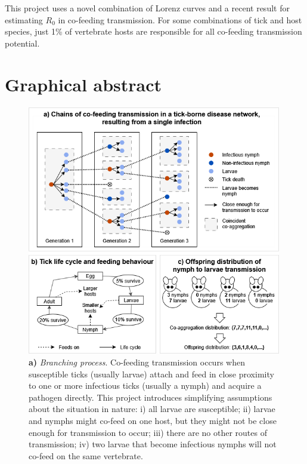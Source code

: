 \documentclass{article}
\begin{document}
This project uses a novel combination of Lorenz curves and a recent result for estimating $ R_0 $ in co-feeding transmission. For some combinations of tick and host species, just 1\% of vertebrate hosts are responsible for all co-feeding transmission potential.

\thispagestyle{empty}
\addtocounter{page}{-1}

\newpage

\section*{Graphical abstract}

\begin{figure}[h!]
	\begin{mdframed}[backgroundcolor=grey250,rightline=false,leftline=false,topline=false]
	    \includegraphics[width=0.99\textwidth, center]{graphical_abstract_mk2.drawio}
	    \caption{
	    \textbf{a)} \textit{Branching process}. Co-feeding transmission  occurs when susceptible ticks (usually larvae) attach and feed in close proximity to one or more infectious ticks (usually a nymph) and acquire a pathogen directly. This project introduces simplifying assumptions about the situation in nature: i) all larvae are susceptible; ii) larvae and nymphs might co-feed on one host, but they might not be close enough for transmission to occur; iii) there are no other routes of transmission; iv) two larvae that become infectious nymphs will not co-feed on the same vertebrate. \\ 
}
\end{mdframed}
\end{figure}
\end{document}

